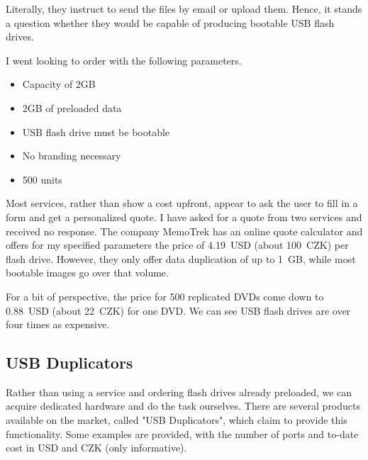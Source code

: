            Literally, they instruct to send the files by email or upload them.  Hence, it stands a question whether they would be capable of producing bootable USB flash drives.
            
            I went looking to order with the following parameters.
            \begin{itemize}
                \item Capacity of 2GB
                \item 2GB of preloaded data
                \item USB flash drive must be bootable
                \item No branding necessary
                \item 500 units
            \end{itemize}
            
            Most services, rather than show a cost upfront, appear to ask the user to fill in a form and get a personalized quote\cite{memorysuppliers}\cite{flashbay}\cite{premiumusb}.  I have asked for a quote from two services and received no response.  The company MemoTrek has an online quote calculator and offers for my specified parameters the price of 4.19~USD (about 100~CZK) per flash drive\cite{memotrek-clip-n-easy}.  However, they only offer data duplication of up to 1~GB, while most bootable images go over that volume.
            
            For a bit of perspective, the price for 500 replicated DVDs come down to 0.88~USD (about 22~CZK) for one DVD\cite{discmakers-quoter}.  We can see USB flash drives are over four times as expensive.
        
        \subsection{USB Duplicators}
            Rather than using a service and ordering flash drives already preloaded, we can acquire dedicated hardware and do the task ourselves.  There are several products available on the market, called "USB Duplicators", which claim to provide this functionality.  Some examples are provided, with the number of ports and to-date cost in USD and CZK (only informative).
            
